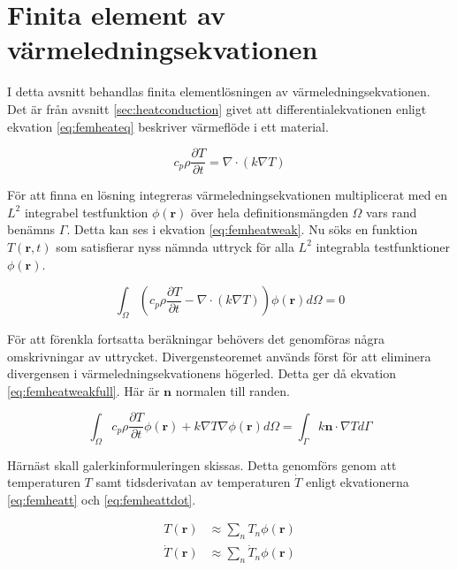 \section{Finita element av värmeledningsekvationen}

I detta avsnitt behandlas finita elementlösningen av värmeledningsekvationen.
Det är från avsnitt \ref{sec:heatconduction} givet att differentialekvationen
enligt ekvation \eqref{eq:femheateq} beskriver värmeflöde i ett material.

\begin{equation}
\label{eq:femheateq}
c_p\rho\frac{\partial T}{\partial t} = \nabla\cdot(k\nabla T)
\end{equation}

\noindent
För att finna en lösning integreras värmeledningsekvationen
multiplicerat med en $L^2$ integrabel testfunktion $\phi(\mathbf{r})$ över hela
definitionsmängden $\Omega$ vars rand benämns $\Gamma$.
Detta kan ses i ekvation \eqref{eq:femheatweak}.
Nu söks en funktion $T(\mathbf{r},t)$ som satisfierar nyss nämnda uttryck för
alla $L^2$ integrabla testfunktioner $\phi(\mathbf{r})$.

\begin{equation}
\label{eq:femheatweak}
\int_\Omega \left(c_p\rho\frac{\partial T}{\partial t} -
\nabla\cdot(k\nabla T)\right)\phi(\mathbf{r})d\Omega = 0
\end{equation}

\noindent
För att förenkla fortsatta beräkningar behövers det genomföras några
omskrivningar av uttrycket. Divergensteoremet används först för att 
eliminera divergensen i värmeledningsekvationens högerled. Detta ger då
ekvation \eqref{eq:femheatweakfull}. Här är $\mathbf{n}$ normalen till randen.

\begin{equation}
\label{eq:femheatweakfull}
\int_\Omega c_p\rho\frac{\partial T}{\partial t}\phi(\mathbf{r}) +
k\nabla T\nabla\phi(\mathbf{r}) d\Omega =
\int_\Gamma k\mathbf{n}\cdot\nabla Td\Gamma
\end{equation}

\noindent
Härnäst skall galerkinformuleringen skissas. Detta genomförs
genom att temperaturen $T$ samt tidsderivatan av temperaturen $\dot{T}$
enligt ekvationerna \eqref{eq:femheatt} och \eqref{eq:femheattdot}.

\begin{align}
\label{eq:femheatt}
T(\mathbf{r}) & \approx \sum_n T_n\phi(\mathbf{r}) \\
\label{eq:femheattdot}
\dot{T}(\mathbf{r}) & \approx \sum_n \dot{T}_n\phi(\mathbf{r})
\end{align}

